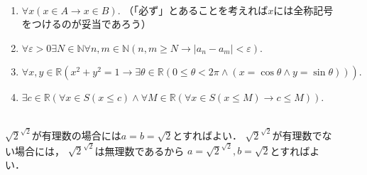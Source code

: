 \begin{description}
\item[] \mbox{} \\
  \begin{enumerate}
    \item $\forall x ( x \in A \to x \in B).$
      （「必ず」とあることを考えれば$x$には全称記号をつけるのが妥当であろう）
    \item $\forall \varepsilon >0 \exists N \in \mathbb{N} \forall n,m \in \mathbb{N}
      (n,m \geq N \to \lvert a_n - a_m \rvert < \varepsilon ).$
    \item $\forall x,y \in \mathbb{R} (x^2+y^2=1 \to \exists \theta \in \mathbb{R} 
      ( 0 \leq \theta <2 \pi \land (x= \cos \theta \land y= \sin \theta ))).$
    \item $\exists c \in \mathbb{R}(\forall x \in S ( x \leq c ) \land 
      \forall M \in \mathbb{R} (\forall x \in S (x \leq M) \to c \leq M)).$
  \end{enumerate}
\item[] \mbox{} \\  
  $\sqrt{2}^{\sqrt{2}}$が有理数の場合には$a = b= \sqrt{2}$とすればよい．
  $\sqrt{2}^{\sqrt{2}}$が有理数でない場合には，
  $\sqrt{2}^{\sqrt{2}}$は無理数であるから
  $a = \sqrt{2} ^{\sqrt{2}},  b= \sqrt{2}$とすればよい．


\end{description}
